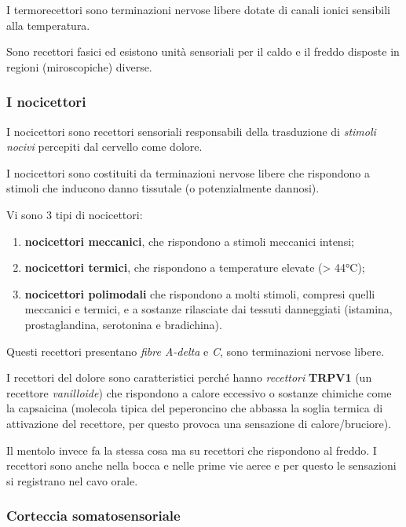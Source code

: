 \documentclass[]{article}
\begin{document}
I termorecettori sono terminazioni nervose libere dotate di canali
ionici sensibili alla temperatura.

Sono recettori fasici ed esistono unità sensoriali per il caldo e il
freddo disposte in regioni (miroscopiche) diverse.

\subsubsection{I nocicettori}\label{i-nocicettori}

I nocicettori sono recettori sensoriali responsabili della trasduzione
di \emph{stimoli nocivi} percepiti dal cervello come dolore.

I nocicettori sono costituiti da terminazioni nervose libere che
rispondono a stimoli che inducono danno tissutale (o potenzialmente
dannosi).

Vi sono 3 tipi di nocicettori:

\begin{enumerate}
\def\labelenumi{\arabic{enumi}.}
\itemsep1pt\parskip0pt
\item
  \textbf{nocicettori meccanici}, che rispondono a stimoli meccanici
  intensi;
\item
  \textbf{nocicettori termici}, che rispondono a temperature elevate
  (\textgreater{} 44°C);
\item
  \textbf{nocicettori polimodali} che rispondono a molti stimoli,
  compresi quelli meccanici e termici, e a sostanze rilasciate dai
  tessuti danneggiati (istamina, prostaglandina, serotonina e
  bradichina).
\end{enumerate}

Questi recettori presentano \emph{fibre A-delta} e \emph{C}, sono
terminazioni nervose libere.

I recettori del dolore sono caratteristici perché hanno \emph{recettori}
\textbf{TRPV1} (un recettore \emph{vanilloide}) che rispondono a calore
eccessivo o sostanze chimiche come la capsaicina (molecola tipica del
peperoncino che abbassa la soglia termica di attivazione del recettore,
per questo provoca una sensazione di calore/bruciore).

Il mentolo invece fa la stessa cosa ma su recettori che rispondono al
freddo. I recettori sono anche nella bocca e nelle prime vie aeree e per
questo le sensazioni si registrano nel cavo orale.

\subsubsection{Corteccia
somatosensoriale}\label{corteccia-somatosensoriale}
\end{document}
